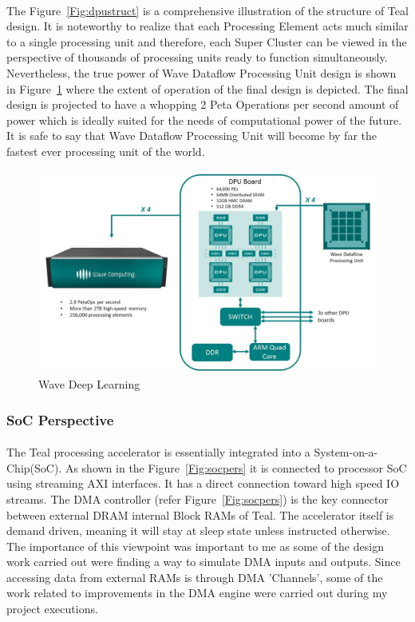 \paragraph{}
The Figure~\ref{Fig:dpustruct} is a comprehensive illustration of the structure of Teal design. It is noteworthy to realize that each Processing Element acts much similar to a single processing unit and therefore, each Super Cluster can be viewed in the perspective of thousands of processing units ready to function simultaneously. Nevertheless, the true power of Wave Dataflow Processing Unit design is shown in Figure~\ref{Fig:dpuboard} where the extent of operation of the final design is depicted. The final design is projected to have a whopping 2 Peta Operations per second amount of power which is ideally suited for the needs of computational power of the future. It is safe to say that Wave Dataflow Processing Unit will become by far the fastest ever processing unit of the world.

\begin{figure}[h]
    \centering
    \includegraphics[trim=0cm 0cm 0cm 0cm, clip=true,scale=0.5]{figures/dpu_board.jpg}
    \caption{Wave Deep Learning\label{Fig:dpuboard}}\vspace{-4mm}
    \end{figure}

\subsubsection{SoC Perspective}
\paragraph{}
The Teal processing accelerator is essentially integrated into a System-on-a-Chip(SoC). As shown in the Figure~\ref{Fig:socpers} it is connected to processor SoC using streaming AXI interfaces. It has a direct connection toward high speed IO streams. The DMA controller (refer Figure~\ref{Fig:socpers}) is the key connector between external DRAM internal Block RAMs of Teal. The accelerator itself is demand driven, meaning it will stay at sleep state unless instructed otherwise. The importance of this viewpoint was important to me as some of the design work carried out were finding a way to simulate DMA inputs and outputs. Since accessing data from external RAMs is through DMA ’Channels’, some of the work related to improvements in the DMA engine were carried out during my project executions. 

